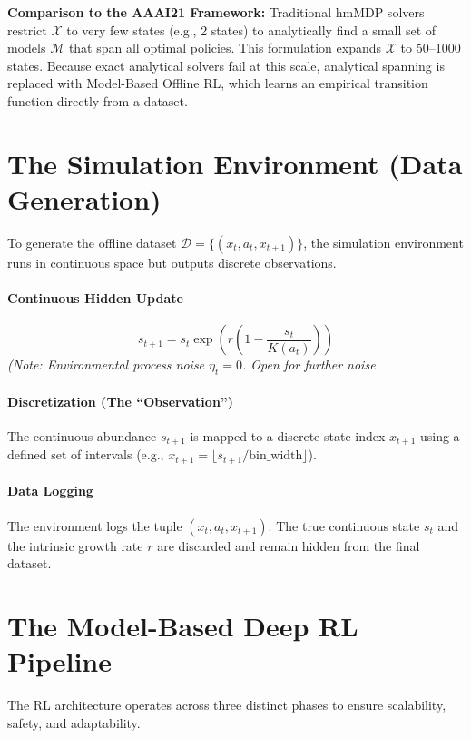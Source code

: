 \documentclass[11pt]{article}
\begin{document}
\noindent \textbf{Comparison to the AAAI21 Framework:} Traditional hmMDP solvers restrict $\mathcal{X}$ to very few states (e.g., 2 states) to analytically find a small set of models $\mathcal{M}$ that span all optimal policies. This formulation expands $\mathcal{X}$ to 50--1000 states. Because exact analytical solvers fail at this scale, analytical spanning is replaced with Model-Based Offline RL, which learns an empirical transition function directly from a dataset.

\section{The Simulation Environment (Data Generation)}
To generate the offline dataset $\mathcal{D} = \{(x_t, a_t, x_{t+1})\}$, the simulation environment runs in continuous space but outputs discrete observations.

\paragraph{Continuous Hidden Update}
$$s_{t+1} = s_t \exp\left(r \left(1 - \frac{s_t}{K(a_t)}\right)\right)$$
\textit{(Note: Environmental process noise $\eta_t = 0$. Open for further noise}

\paragraph{Discretization (The ``Observation'')}
The continuous abundance $s_{t+1}$ is mapped to a discrete state index $x_{t+1}$ using a defined set of intervals (e.g., $x_{t+1} = \lfloor s_{t+1} / \text{bin\_width} \rfloor$).

\paragraph{Data Logging}
The environment logs the tuple $(x_t, a_t, x_{t+1})$. The true continuous state $s_t$ and the intrinsic growth rate $r$ are discarded and remain hidden from the final dataset.

\section{The Model-Based Deep RL Pipeline}
The RL architecture operates across three distinct phases to ensure scalability, safety, and adaptability.
\end{document}
